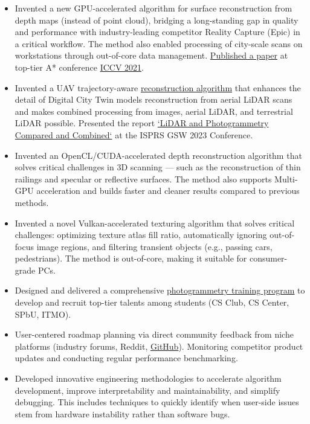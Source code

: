 \documentclass[11pt,oneside]{article}
\newcommand{\hhref}[2]{\href{#1}{\color{blue}#2}}
\begin{document}
\begin{description}
\begin{itemize}
      \item Invented a new GPU-accelerated algorithm for surface reconstruction from depth maps (instead of point cloud), bridging a long-standing gap in quality and performance with industry-leading competitor Reality Capture (Epic) in a critical workflow. The method also enabled processing of city-scale scans on workstations through out-of-core data management. \hhref{https://www.polarnick.com/static/papers/poliarnyi2021.pdf}{Published a paper} at top-tier A* conference \hhref{https://openaccess.thecvf.com/content/ICCV2021/html/Poliarnyi_Out-of-Core_Surface_Reconstruction_via_Global_TGV_Minimization_ICCV_2021_paper.html}{ICCV 2021}.
      \item Invented a UAV trajectory-aware \hhref{https://www.youtube.com/watch?v=tiOeMgLHSrA}{reconstruction algorithm} that enhances the detail of Digital City Twin models reconstruction from aerial LiDAR scans and makes combined processing from images, aerial LiDAR, and terrestrial LiDAR possible. Presented the report \hhref{https://polarnick.com/static/presentations/AgisoftMetashapeGSW2023.pdf}{‘LiDAR and Photogrammetry Compared and Combined‘} at the ISPRS GSW 2023 Conference.
      \item Invented an OpenCL/CUDA-accelerated depth reconstruction algorithm that solves critical challenges in 3D scanning — such as the reconstruction of thin railings and specular or reflective surfaces. The method also supports Multi-GPU acceleration and builds faster and cleaner results compared to previous methods.
      \item Invented a novel Vulkan-accelerated texturing algorithm that solves critical challenges: optimizing texture atlas fill ratio, automatically ignoring out-of-focus image regions, and filtering transient objects (e.g., passing cars, pedestrians). The method is out-of-core, making it suitable for consumer-grade PCs.
      \item Designed and delivered a comprehensive \hhref{https://www.youtube.com/playlist?list=PL5p-5hHpsHBp4yTpeZJ_QMSmJPAuov-VF}{photogrammetry training program} to develop and recruit top-tier talents among students (CS Club, CS Center, SPbU, ITMO).
      \item User-centered roadmap planning via direct community feedback from niche platforms (industry forums, Reddit, \hhref{https://github.com/agisoft-llc/metashape-scripts}{GitHub}). Monitoring competitor product updates and conducting regular performance benchmarking.
      \item Developed innovative engineering methodologies to accelerate algorithm development, improve interpretability and maintainability, and simplify debugging. This includes techniques to quickly identify when user-side issues stem from hardware instability rather than software bugs.

\end{itemize}
\end{description}
\end{document}
